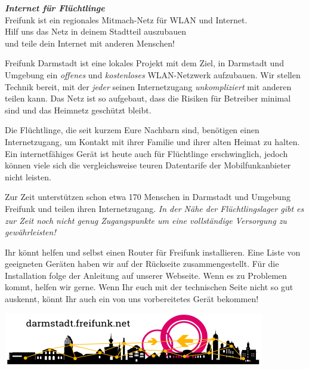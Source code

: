 \documentclass[a4paper]{article}
\begin{document}
\thispagestyle{empty}
 
\begin{center}
\Huge \textit{\textbf{\textcolor{freifunkpink}{Internet für Flüchtlinge}}} \\
\vspace{0.6cm}
\large Freifunk ist ein regionales Mitmach-Netz für WLAN und Internet.\\
Hilf uns das Netz in deinem Stadtteil auszubauen \\
und teile dein Internet mit anderen Menschen!
\normalsize

\vspace{1.0cm}
\end{center}

{ }
\vspace{0.5cm}

Freifunk Darmstadt ist eine lokales Projekt mit dem Ziel, in Darmstadt und Umgebung ein \emph{offenes} und \emph{kostenloses} WLAN-Netzwerk aufzubauen. Wir stellen Technik bereit, mit der \emph{jeder} seinen Internetzugang \emph{unkompliziert} mit anderen teilen kann. Das Netz ist so aufgebaut, dass die Risiken für Betreiber minimal sind und das Heimnetz geschützt bleibt.

Die Flüchtlinge, die seit kurzem Eure Nachbarn sind, benötigen einen Internetzugang, um Kontakt mit ihrer Familie und ihrer alten Heimat zu halten. Ein internetfähiges Gerät ist heute auch für Flüchtlinge erschwinglich, jedoch können viele sich die vergleichsweise teuren Datentarife der Mobilfunkanbieter nicht leisten.

Zur Zeit unterstützen schon etwa 170 Menschen in Darmstadt und Umgebung Freifunk und teilen ihren Internetzugang. \emph{In der Nähe der Flüchtlingslager gibt es zur Zeit noch nicht genug Zugangspunkte um eine vollständige Versorgung zu gewährleisten!}

Ihr könnt helfen und selbst einen Router für Freifunk installieren. Eine Liste von geeigneten Geräten haben wir auf der Rückseite zusammengestellt. Für die Installation folge der Anleitung auf unserer Webseite. Wenn es zu Problemen kommt, helfen wir gerne.
Wenn Ihr euch mit der technischen Seite nicht so gut auskennt, könnt Ihr auch ein von uns vorbereitetes Gerät bekommen!

\vspace{0.6cm}

\begin{center}
\includegraphics[width=\textwidth]{logo}
\end{center}
\end{document}
